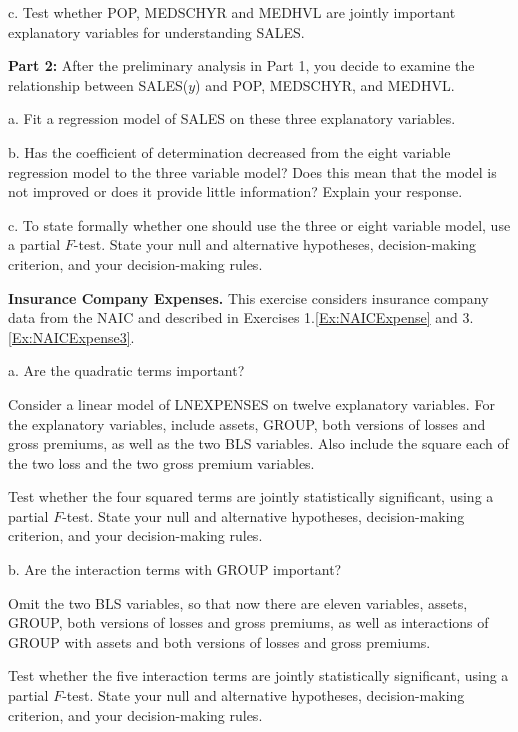 \begin{exercises}
c. Test whether POP, MEDSCHYR and MEDHVL are jointly important
explanatory variables for understanding SALES.


\textbf{Part 2:} After the preliminary analysis in Part 1, you
decide to examine the relationship between SALES($y$) and POP,
MEDSCHYR, and MEDHVL.

a. Fit a regression model of SALES on these three explanatory
variables.

b. Has the coefficient of determination decreased from the eight
variable regression model to the three variable model? Does this
mean that the model is not improved or does it provide little
information? Explain your response.

c. To state formally whether one should use the three or eight
variable model, use a partial $F$-test. State your null and
alternative hypotheses, decision-making criterion, and your
decision-making rules.


\item \textbf{Insurance Company Expenses.}\label{Ex:NAICExpense4}
This exercise considers insurance company data from the NAIC and
described in Exercises 1.\ref{Ex:NAICExpense} and
3.\ref{Ex:NAICExpense3}.


a. Are the quadratic terms important?

Consider a linear model of LNEXPENSES on twelve explanatory
variables. For the explanatory variables, include assets, GROUP,
both versions of losses and gross premiums, as well as the two BLS
variables. Also include the square each of the two loss and the two
gross premium variables.

Test whether the four squared terms are jointly statistically
significant, using a partial $F$-test. State your null and
alternative hypotheses, decision-making criterion, and your
decision-making rules.

b. Are the interaction terms with GROUP important?

Omit the two BLS variables, so that now there are eleven variables,
assets, GROUP, both versions of losses and gross premiums, as well
as interactions of GROUP with assets and both versions of losses and
gross premiums.

Test whether the five interaction terms are jointly statistically
significant, using a partial $F$-test. State your null and
alternative hypotheses, decision-making criterion, and your
decision-making rules.


\end{exercises}
